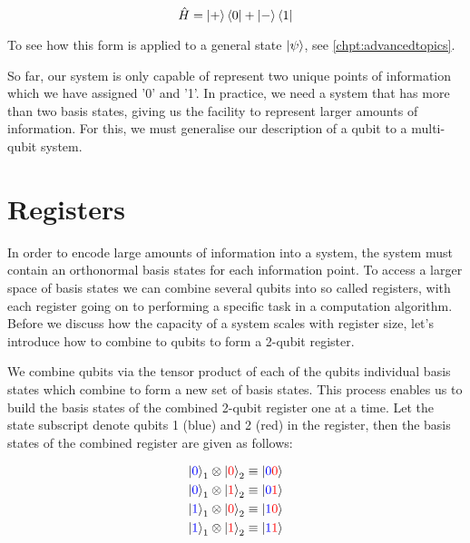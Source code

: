 \begin{equation}
    \hat{H}=\left\vert{+}\right\rangle\left\langle{0}\right\vert+\left\vert{-}\right\rangle\left\langle{1}\right\vert
\end{equation}

To see how this form is applied to a general state $\left\vert{\psi}\right\rangle$, see \autoref{chpt:advancedtopics}.

So far, our system is only capable of represent two unique points of information which we have assigned '0' and '1'. In practice, we need a system that has more than two basis states, giving us the facility to represent larger amounts of information. For this, we must generalise our description of a qubit to a multi-qubit system.


\section{Registers}


In order to encode large amounts of information into a system, the system must contain an orthonormal basis states for each information point. To access a larger space of basis states we can combine several qubits into so called registers, with each register going on to performing a specific task in a computation algorithm. Before we discuss how the capacity of a system scales with register size, let's introduce how to combine to qubits to form a 2-qubit register.

We combine qubits via the tensor product of each of the qubits individual basis states which combine to form a new set of basis states. This process enables us to build the basis states of the combined 2-qubit register one at a time. Let the state subscript denote qubits 1 (blue) and 2 (red) in the register, then the basis states of the combined register are given as follows:

\begin{equation}
\begin{split}
    \left\vert{\textcolor{blue}{0}}\right\rangle_1\otimes\left\vert{\textcolor{red}{0}}\right\rangle_2 \equiv\left\vert{\textcolor{blue}{0}\textcolor{red}{0}}\right\rangle\\
    \left\vert{\textcolor{blue}{0}}\right\rangle_1\otimes\left\vert{\textcolor{red}{1}}\right\rangle_2 \equiv\left\vert{\textcolor{blue}{0}\textcolor{red}{1}}\right\rangle\\
    \left\vert{\textcolor{blue}{1}}\right\rangle_1\otimes\left\vert{\textcolor{red}{0}}\right\rangle_2 \equiv\left\vert{\textcolor{blue}{1}\textcolor{red}{0}}\right\rangle\\
    \left\vert{\textcolor{blue}{1}}\right\rangle_1\otimes\left\vert{\textcolor{red}{1}}\right\rangle_2 \equiv\left\vert{\textcolor{blue}{1}\textcolor{red}{1}}\right\rangle
\end{split}
\end{equation}

